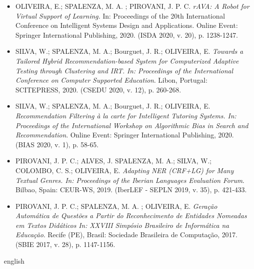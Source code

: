 \documentclass[
	12pt,				%
	openright,			%
	twoside,			%
	a4paper,			%
	english,			%
	french,				%
	spanish,			%
	brazil				%
	]{abntex2}
\begin{document}
\begin{itemize}[label={}]
\scriptsize
\item OLIVEIRA, E.; SPALENZA, M. A. ; PIROVANI, J. P. C. \textit{rAVA: A Robot for Virtual Support of Learning.} In: Proceedings of the 20th International Conference on Intelligent Systems Design and Applications. Online Event: Springer International Publishing, 2020. (ISDA 2020, v. 20), p. 1238-1247.

\item SILVA, W.; SPALENZA, M. A.; Bourguet, J. R.; OLIVEIRA, E. \textit{Towards a Tailored Hybrid Recommendation-based System for Computerized Adaptive Testing through Clustering and IRT. In: Proceedings of the International Conference on Computer Supported Education}. Libon, Portugal: SCITEPRESS, 2020. (CSEDU 2020, v. 12), p. 260-268.

\item SILVA, W.; SPALENZA, M. A.; Bourguet, J. R.; OLIVEIRA, E. \textit{Recommendation Filtering {\`a} la carte for Intelligent Tutoring Systems. In: Proceedings of the International Workshop on Algorithmic Bias in Search and Recommendation}. Online Event:  Springer International Publishing, 2020. (BIAS 2020, v. 1), p. 58-65.

\item PIROVANI, J. P. C.; ALVES, J. SPALENZA, M. A.; SILVA, W.; COLOMBO, C. S.; OLIVEIRA, E. \textit{Adapting NER (CRF+LG) for Many Textual Genres. In: Proceedings of the Iberian Languages Evaluation Forum}. Bilbao, Spain: CEUR-WS, 2019. (IberLEF - SEPLN 2019, v. 35), p. 421-433. 

\item PIROVANI, J. P. C.; SPALENZA, M. A. ; OLIVEIRA, E. \textit{Gera{\c c}{\~a}o Autom{\'a}tica de Quest{\~o}es a Partir do Reconhecimento de Entidades Nomeadas em Textos Did{\'a}ticos In: XXVIII Simp{\'o}sio Brasileiro de Inform{\'a}tica na Educa{\c c}{\~a}o}. Recife (PE), Brasil: Sociedade Brasileira de Computa{\c c}{\~a}o, 2017. (SBIE 2017, v. 28), p. 1147-1156.

\end{itemize}

\cleardoublepage

\setlength{\absparsep}{18pt}
\begin{resumo}

\end{resumo}


\begin{resumo}[Abstract]
\begin{otherlanguage*}{english}

\end{otherlanguage*}
\end{resumo}
\end{document}
